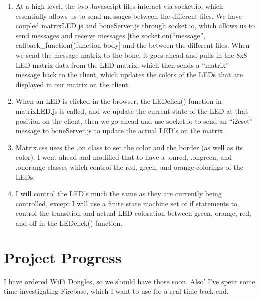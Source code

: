 \documentclass[letterpaper,10pt]{texMemo}
\begin{document}
\begin{enumerate}
 \item At a high level, the two Javascript files interact via socket.io, which
essentially allows us to send messages between the different files. We have
coupled matrixLED.js and boneServer.js through socket.io, which allows us to
send messages and receive messages [the socket.on(``message'',
callback\_function(){function body}] and the  between the different files. When
we send the message matrix to the bone, it goes ahead and pulls in the 8x8 LED
matrix data from the LED matrix, which then sends a ``matrix'' message back to
the client, which updates the colors of the LEDs that are displayed in our
matrix on the client.
  \item When an LED is clicked in the browser, the LEDclick() function in
matrixLED.js is called, and we update the current state of the LED at that
position on the client, then we go ahead and use socket.io to send an ``i2cset''
message to boneServer.js to update the actual LED's on the matrix.
  \item Matrix.css uses the .on class to set the color and the border (as well
as its color). I went ahead and modified that to have a .onred, .ongreen, and
.onorange classes which control the red, green, and orange colorings of the
LEDs.
  \item I will control the LED's much the same as they are currently being
controlled, except I will use a finite state machine set of if statements to
control the transition and actual LED coloration between green, orange, red, and
off in the LEDclick() function.
\end{enumerate}


\section{Project Progress}
\noindent I have ordered WiFi Dongles, so we should have those soon. Also' I've
spent some time investigating Firebase, which I want to use for a real time
back end.
\end{document}
